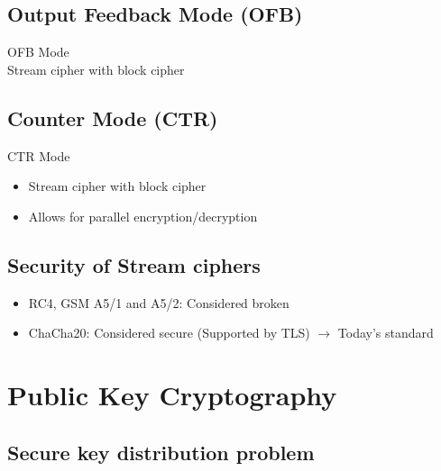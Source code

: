 \subsection{Output Feedback Mode (OFB)}

\begin{concept}{OFB Mode}\\
    Stream cipher with block cipher
\end{concept}


\subsection{Counter Mode (CTR)}

\begin{concept}{CTR Mode}\\
    \begin{itemize}
        \item Stream cipher with block cipher
        \item Allows for parallel encryption/decryption
    \end{itemize}
\end{concept}


\subsection{Security of Stream ciphers}

\begin{remark}
    \begin{itemize}
        \item RC4, GSM A5/1 and A5/2: Considered broken
        \item ChaCha20: Considered secure (Supported by TLS) $\rightarrow$ Today's standard
    \end{itemize}
\end{remark}

\section{Public Key Cryptography}

\subsection{Secure key distribution problem}

